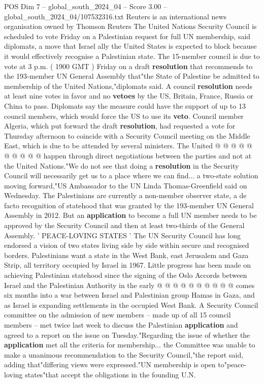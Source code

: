 \begin{textsample}{POS Dim 7 – global\_south\_2024\_04 – Score 3.00 – global\_south\_2024\_04/107532316.txt}  \label{ex:f7_pos_105}
Reuters is an international news organisation owned by Thomson Reuters The United Nations Security Council is scheduled to vote Friday on a Palestinian request for full UN membership, said diplomats, a move that Israel ally the United States is expected to block because it would effectively recognise a Palestinian state.
The 15-member council is due to vote at 3 p.m. ( 1900 GMT ) Friday on a draft \textbf{resolution} that recommends to the 193-member UN General Assembly that"the State of Palestine be admitted to membership of the United Nations,"diplomats said.
A council \textbf{resolution} needs at least nine votes in favor and no \textbf{vetoes} by the US, Britain, France, Russia or China to pass.
Diplomats say the measure could have the support of up to 13 council members, which would force the US to use its \textbf{veto}.
Council member Algeria, which put forward the draft \textbf{resolution}, had requested a vote for Thursday afternoon to coincide with a Security Council meeting on the Middle East, which is due to be attended by several ministers.
The United @ @ @ @ @ @ @ @ @ @ happen through direct negotiations between the parties and not at the United Nations."We do not see that doing a \textbf{resolution} in the Security Council will necessarily get us to a place where we can find... a two-state solution moving forward,"US Ambassador to the UN Linda Thomas-Greenfield said on Wednesday.
The Palestinians are currently a non-member observer state, a de facto recognition of statehood that was granted by the 193-member UN General Assembly in 2012.
But an \textbf{application} to become a full UN member needs to be approved by the Security Council and then at least two-thirds of the General Assembly. ' PEACE-LOVING STATES ' The UN Security Council has long endorsed a vision of two states living side by side within secure and recognised borders.
Palestinians want a state in the West Bank, east Jerusalem and Gaza Strip, all territory occupied by Israel in 1967.
Little progress has been made on achieving Palestinian statehood since the signing of the Oslo Accords between Israel and the Palestinian Authority in the early @ @ @ @ @ @ @ @ @ @ comes six months into a war between Israel and Palestinian group Hamas in Gaza, and as Israel is expanding settlements in the occupied West Bank.
A Security Council committee on the admission of new members -- made up of all 15 council members -- met twice last week to discuss the Palestinian \textbf{application} and agreed to a report on the issue on Tuesday."Regarding the issue of whether the \textbf{application} met all the criteria for membership... the Committee was unable to make a unanimous recommendation to the Security Council,"the report said, adding that"differing views were expressed."UN membership is open to"peace-loving states"that accept the obligations in the founding U.N.

\end{textsample}
